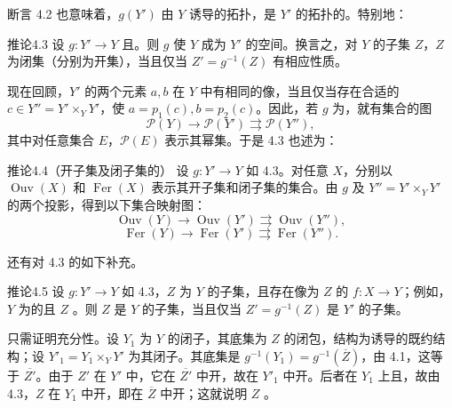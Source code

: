 断言 4.2 也意味着，$g(Y')$ 由 $Y$ 诱导的拓扑，是 $Y'$ 的拓扑的。特别地：
\begin{SGAresult}{推论}{4.3}
设 $g:Y'\to Y$ 且。则 $g$ 使 $Y$ 成为 $Y'$ 的空间。换言之，对 $Y$ 的子集 $Z$，$Z$ 为闭集（分别为开集），当且仅当 $Z'=g^{-1}(Z)$ 有相应性质。
\end{SGAresult}
现在回顾，$Y'$ 的两个元素 $a,b$ 在 $Y$ 中有相同的像，当且仅当存在合适的 $c\in Y''=Y'\times_Y Y'$，使 $a=p_1(c),b=p_2(c)$。因此，若 $g$ 为，就有集合的图
\[
\mathcal P(Y)\longrightarrow\mathcal P(Y')\rightrightarrows\mathcal P(Y''),
\]
其中对任意集合 $E$，$\mathcal P(E)$ 表示其幂集。于是 4.3 也述为：
\begin{SGAresult}{推论}{4.4（开子集及闭子集的）}
设 $g:Y'\to Y$ 如 4.3。对任意 $X$，分别以 $\operatorname{Ouv}(X)$ 和 $\operatorname{Fer}(X)$ 表示其开子集和闭子集的集合。由 $g$ 及 $Y''=Y'\times_Y Y'$ 的两个投影，得到以下集合映射图：
\[
\operatorname{Ouv}(Y)\longrightarrow\operatorname{Ouv}(Y')\rightrightarrows\operatorname{Ouv}(Y''),
\]
\[
\operatorname{Fer}(Y)\longrightarrow\operatorname{Fer}(Y')\rightrightarrows\operatorname{Fer}(Y'').
\]
\end{SGAresult}
还有对 4.3 的如下补充。
\begin{SGAresult}{推论}{4.5}
设 $g:Y'\to Y$ 如 4.3，$Z$ 为 $Y$ 的子集，且存在像为 $Z$ 的 $f:X\to Y$；例如，$Y$ 为的且 $Z$ 。则 $Z$ 是 $Y$ 的子集，当且仅当 $Z'=g^{-1}(Z)$ 是 $Y'$ 的子集。
\end{SGAresult}
只需证明充分性。设 $Y_1$ 为 $Y$ 的闭子，其底集为 $Z$ 的闭包，结构为诱导的既约结构；设 $Y'_1=Y_1\times_Y Y'$ 为其闭子。其底集是 $g^{-1}(Y_1)=g^{-1}(\overline Z)$，由 4.1，这等于 $\overline{Z'}$。由于 $Z'$ 在 $Y'$ 中，它在 $\overline{Z'}$ 中开，故在 $Y'_1$ 中开。后者在 $Y_1$ 上且，故由 4.3，$Z$ 在 $Y_1$ 中开，即在 $\overline Z$ 中开；这就说明 $Z$ 。

